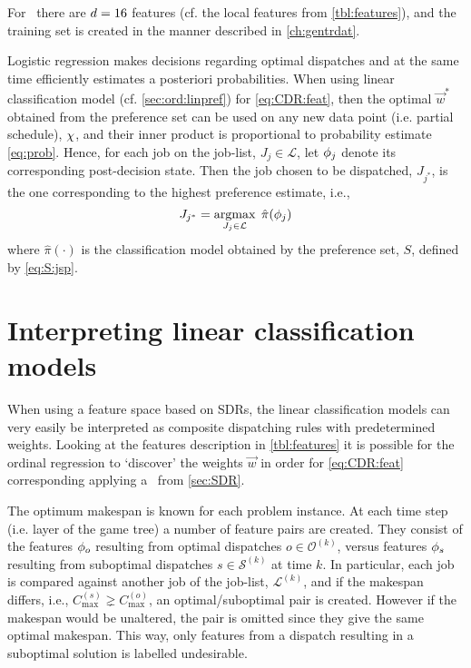 For \jsp\ there are $d=16$ features (cf. the local features from 
\cref{tbl:features}), and the training set is created in the 
manner described in \cref{ch:gentrdat}.

Logistic regression makes decisions regarding optimal dispatches and at the 
same time efficiently estimates a posteriori probabilities. When using linear 
classification model (cf. \cref{sec:ord:linpref}) for \cref{eq:CDR:feat},
then the optimal $\vec{w}^*$ obtained from the preference set can be used on 
any new data point (i.e. partial schedule), ${\mathbf{\chi}}$, and their inner product is 
proportional to probability estimate \cref{eq:prob}. 
Hence, for each job on the job-list, $J_j\in\mathcal{L}$, let ${\mathbf{\phi}}_j$ denote 
its corresponding  post-decision state. Then the job chosen to be dispatched, 
$J_{j^*}$, is the one corresponding to the highest preference estimate, i.e.,
\begin{equation}\label{eq:lin}
	J_{j^*}=\argmax_{J_j\in \mathcal{L}}\; \hat{\pi}(\vphi_j)
\end{equation}
where $\hat{\pi}(\cdot)$ is the classification model obtained by the preference 
set, $S$, defined by \cref{eq:S:jsp}. 


\section{Interpreting linear classification models}

When using a feature space based on SDRs, the linear classification models can 
very easily be interpreted as composite dispatching rules with predetermined 
weights. 
Looking at the features description in \cref{tbl:features} it is possible for 
the ordinal regression to `discover' the weights $\vec{w}$ in order for 
\cref{eq:CDR:feat} corresponding applying a \sdr~from \cref{sec:SDR}. 

The optimum makespan is known for each problem instance. 
At each time step (i.e. layer of the game tree) a number of feature pairs are created. 
They consist of the features ${\mathbf{\phi}}_o$ resulting from optimal dispatches $o\in\mathcal{O}^{(k)}$, versus features ${\mathbf{\phi}}_s$ resulting from suboptimal dispatches $s\in\mathcal{S}^{(k)}$ at time $k$. 
In particular, each job is compared against another job of the job-list, 
$\mathcal{L}^{(k)}$, and if the makespan differs, i.e., $C_{\max}^{(s)}\gneq 
C_{\max}^{(o)}$, an optimal/suboptimal pair is created. 
However if the makespan would be unaltered, the pair is omitted since they give the same optimal makespan. 
This way, only features from a dispatch resulting in a suboptimal solution is labelled undesirable.

